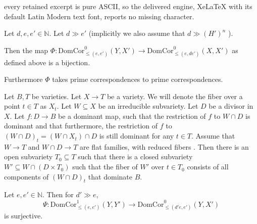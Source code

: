 \documentclass[10pt,a4paper]{amsart}
\def \DC{{\mathrm{DomCor}}}
\def\NN{{\mathbb N}}
\begin{document}
every retained excerpt is pure ASCII, so the delivered engine, XeLaTeX with its default Latin Modern text font, reports no missing character.
\begin{theorem}\label{main}
    Let $d, e,  e' \in \NN$. Let $d \gg e'$ (implicitly  we also assume that $d \gg (H')^n$ ).

Then the map $\Phi: \DC^0_{\le (e, e')}(Y, X') \to \DC^0_{\le (e, de')} (X,X') $ as defined above is a bijection.  

Furthermore $\Phi$ takes prime correspondences to prime correspondences.
\end{theorem}

\begin{proposition}\label{famgen}
    Let  $B, T$ be   varieties. Let $X \to T$ be a variety. We will denote the fiber over a point $t \in T$ as $X_t$.
    Let $W \subseteq X$ be an irreducible subvariety. Let $D$ be a divisor in $X$. Let $f : D \to B$ be a dominant map, such that the restriction  of $f$ to $W \cap D$ is  dominant and that furthermore, the restriction of $f$ to  $ (W \cap D)_t = (W \cap X_t) \cap D$ is still dominant for any $t \in T$.
    Assume that $W \to T$ and $W \cap D \to T$ are flat families, with reduced fibers . Then there is an open subvariety $T_0 \subseteq T$  such that  there is a closed subvariety $W' \subseteq W \cap (D \times T_0)$  such that the fiber of $W'$ over $t\in T_0$ consists of all components of $(W \cap D)_t$ that dominate $B$.
\end{proposition}

\begin{proposition}
 Let $e,e' \in \NN$. Then for $d' \gg e $, $$\Psi: \DC^1_{\le(e,e')}(Y, Y') \to \DC^0_{\le (d'e,e')}(Y, X')$$ is surjective.
\end{proposition}
\end{document}
